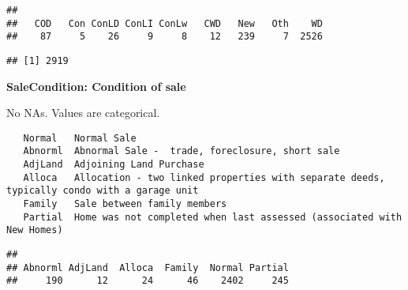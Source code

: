 \documentclass[]{article}
\newenvironment{Shaded}{\begin{snugshade}}{\end{snugshade}}
\newcommand{\KeywordTok}[1]{\textcolor[rgb]{0.13,0.29,0.53}{\textbf{#1}}}
\newcommand{\StringTok}[1]{\textcolor[rgb]{0.31,0.60,0.02}{#1}}
\newcommand{\OperatorTok}[1]{\textcolor[rgb]{0.81,0.36,0.00}{\textbf{#1}}}
\newcommand{\NormalTok}[1]{#1}
\begin{document}
\begin{verbatim}
## 
##   COD   Con ConLD ConLI ConLw   CWD   New   Oth    WD 
##    87     5    26     9     8    12   239     7  2526
\end{verbatim}

\begin{Shaded}
\end{Shaded}

\begin{verbatim}
## [1] 2919
\end{verbatim}

\textbf{SaleCondition: Condition of sale}

No NAs. Values are categorical.

\begin{verbatim}
   Normal   Normal Sale
   Abnorml  Abnormal Sale -  trade, foreclosure, short sale
   AdjLand  Adjoining Land Purchase
   Alloca   Allocation - two linked properties with separate deeds, typically condo with a garage unit  
   Family   Sale between family members
   Partial  Home was not completed when last assessed (associated with New Homes)
\end{verbatim}

\begin{Shaded}
\end{Shaded}

\begin{verbatim}
## 
## Abnorml AdjLand  Alloca  Family  Normal Partial 
##     190      12      24      46    2402     245
\end{verbatim}

\begin{Shaded}
\end{Shaded}
\end{document}
